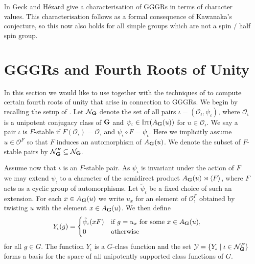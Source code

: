 \documentclass{jt-calcs}
\renewcommand{\cref}{\Cref}
\begin{document}
\begin{rem}
In \cite[Proposition 4.6]{geck-hezard:2008:unipotent-support} Geck and H\'{e}zard give a characterisation of GGGRs in terms of character values. This characterisation follows as a formal consequence of Kawanaka's conjecture, so this now also holds for all simple groups which are not a spin / half spin group.
\end{rem}

\section{GGGRs and Fourth Roots of Unity}\label{sec:fourth-roots}
In this section we would like to use \cref{thm:A} together with the techniques of \cite[\S 3]{geck:1999:character-sheaves-and-GGGRs} to compute certain fourth roots of unity that arise in connection to GGGRs. We begin by recalling the setup of \cite{geck:1999:character-sheaves-and-GGGRs}. Let $\mathcal{N}_{\mathbf{G}}$ denote the set of all pairs $\iota = (\mathcal{O}_{\iota},\psi_{\iota})$, where $\mathcal{O}_{\iota}$ is a unipotent conjugacy class of $\mathbf{G}$ and $\psi_{\iota} \in \operatorname{Irr}(A_{\mathbf{G}}(u))$ for $u \in \mathcal{O}_{\iota}$. We say a pair $\iota$ is $F$-stable if $F(\mathcal{O}_{\iota}) = \mathcal{O}_{\iota}$ and $\psi_{\iota}\circ F = \psi_{\iota}$. Here we implicitly assume $u \in \mathcal{O}^F$ so that $F$ induces an automorphism of $A_{\mathbf{G}}(u)$. We denote the subset of $F$-stable pairs by $\mathcal{N}_{\mathbf{G}}^F \subseteq \mathcal{N}_{\mathbf{G}}$.

Assume now that $\iota$ is an $F$-stable pair. As $\psi_{\iota}$ is invariant under the action of $F$ we may extend $\psi_{\iota}$ to a character of the semidirect product $A_{\mathbf{G}}(u) \rtimes \langle F \rangle$, where $F$ acts as a cyclic group of automorphisms. Let $\tilde{\psi}_{\iota}$ be a fixed choice of such an extension. For each $x \in A_{\mathbf{G}}(u)$ we write $u_x$ for an element of $\mathcal{O}_{\iota}^F$ obtained by twisting $u$ with the element $x \in A_{\mathbf{G}}(u)$. We then define
\begin{equation*}
Y_{\iota}(g) = \begin{cases}
\tilde{\psi}_{\iota}(xF) &\text{if }g = u_x\text{ for some }x \in A_{\mathbf{G}}(u),\\
0 &\text{otherwise}
\end{cases}
\end{equation*}
for all $g \in G$. The function $Y_{\iota}$ is a $G$-class function and the set $\mathcal{Y} = \{Y_{\iota} \mid \iota \in \mathcal{N}_{\mathbf{G}}^F\}$ forms a basis for the space of all unipotently supported class functions of $G$.
\end{document}
